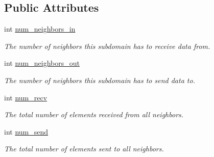 \subsection*{Public Attributes}
\begin{DoxyCompactItemize}
\item 
\mbox{\label{structschwz_1_1Communicate_1_1comm__struct_aab657581d6c8ea5aba32f442edc4558f}} 
int \hyperlink{structschwz_1_1Communicate_1_1comm__struct_aab657581d6c8ea5aba32f442edc4558f}{num\+\_\+neighbors\+\_\+in}
\begin{DoxyCompactList}\small\item\em The number of neighbors this subdomain has to receive data from. \end{DoxyCompactList}\item 
\mbox{\label{structschwz_1_1Communicate_1_1comm__struct_a356e1582f7d5b0c4c8cba3eb11014b76}} 
int \hyperlink{structschwz_1_1Communicate_1_1comm__struct_a356e1582f7d5b0c4c8cba3eb11014b76}{num\+\_\+neighbors\+\_\+out}
\begin{DoxyCompactList}\small\item\em The number of neighbors this subdomain has to send data to. \end{DoxyCompactList}\item 
\mbox{\label{structschwz_1_1Communicate_1_1comm__struct_a956bfe9ef9cd9ae0e08cfef23b197259}} 
int \hyperlink{structschwz_1_1Communicate_1_1comm__struct_a956bfe9ef9cd9ae0e08cfef23b197259}{num\+\_\+recv}
\begin{DoxyCompactList}\small\item\em The total number of elements received from all neighbors. \end{DoxyCompactList}\item 
\mbox{\label{structschwz_1_1Communicate_1_1comm__struct_a7b5dc332e1d8d88da08aae0214b6ae73}} 
int \hyperlink{structschwz_1_1Communicate_1_1comm__struct_a7b5dc332e1d8d88da08aae0214b6ae73}{num\+\_\+send}
\begin{DoxyCompactList}\small\item\em The total number of elements sent to all neighbors. \end{DoxyCompactList}\item 

\end{DoxyCompactItemize}
